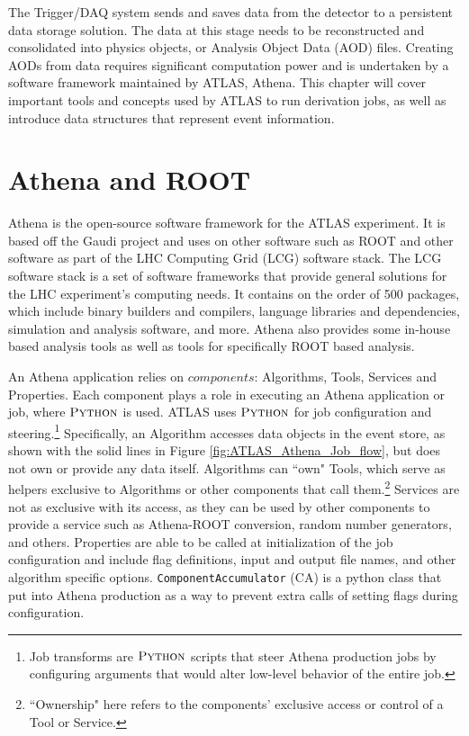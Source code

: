 The Trigger/DAQ system sends and saves data from the detector to a persistent data storage solution.
The data at this stage needs to be reconstructed and consolidated into physics objects, or Analysis Object Data (AOD) files.
Creating AODs from data requires significant computation power and is undertaken by a software framework maintained by ATLAS, Athena.
This chapter will cover important tools and concepts used by ATLAS to run derivation jobs, as well as introduce data structures that represent event information. 

\section{Athena and ROOT}
Athena is the open-source software framework for the ATLAS experiment.\cite{athena}
It is based off the Gaudi project and uses on other software such as ROOT and other software as part of the LHC Computing Grid (LCG) software stack.\cite{WLCG_Tech_design_report}
The LCG software stack is a set of software frameworks that provide general solutions for the LHC experiment's computing needs. 
It contains on the order of 500 packages, which include binary builders and compilers, language libraries and dependencies, simulation and analysis software, and more.
Athena also provides some in-house based analysis tools as well as tools for specifically ROOT based analysis.

An Athena application relies on $\textit{components}$: Algorithms, Tools, Services and Properties. \cite{Aad:2895022}  
Each component plays a role in executing an Athena application or job, where $\textsc{Python}$ is used.
ATLAS uses $\textsc{Python}$ for job configuration and steering.\footnote{Job transforms are $\textsc{Python}$ scripts that steer Athena production jobs by configuring arguments that would alter low-level behavior of the entire job. }
Specifically, an Algorithm accesses data objects in the event store, as shown with the solid lines in Figure \ref{fig:ATLAS_Athena_Job_flow}, but does not own or provide any data itself.
Algorithms can ``own" Tools, which serve as helpers exclusive to Algorithms or other components that call them.\footnote{``Ownership" here refers to the components' exclusive access or control of a Tool or Service.} 
Services are not as exclusive with its access, as they can be used by other components to provide a service such as Athena-ROOT conversion, random number generators, and others. 
Properties are able to be called at initialization of the job configuration and include flag definitions, input and output file names, and other algorithm specific options.
\verb|ComponentAccumulator| (CA) is a python class that put into Athena production as a way to prevent extra calls of setting flags during configuration. 

